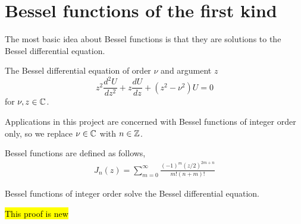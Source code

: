 \section{Bessel functions of the first kind}
The most basic idea about Bessel functions is that they are solutions to the Bessel differential equation.
%
%
\begin{defn}The Bessel differential equation of order $\nu$ and argument $z$
  \begin{equation}\label{eq:bessel_differential}
      z^2 \frac{d^2 U}{dz^2} + z\frac{dU}{dz} + (z^2 - \nu^2)U = 0
  \end{equation}
for $\nu, z \in \mathbb{C}$.
\end{defn}\par
%
Applications in this project are concerned with Bessel functions of integer order only, so we replace $\nu \in \mathbb{C}$ with $n \in \mathbb{Z}$.
%
\begin{defn}\label{defn:bessel_func}
Bessel functions are defined as follows,
  \begin{align*}
      J_n(z) = \sum^\infty_{m=0} \frac{
      (-1)^m (z/2)^{2m+n} }{
      m! (n+m)! }
  \end{align*}
\end{defn}
%
%
\begin{propn} Bessel functions of integer order solve the Bessel differential equation.
\end{propn}
\hl{This proof is new}
